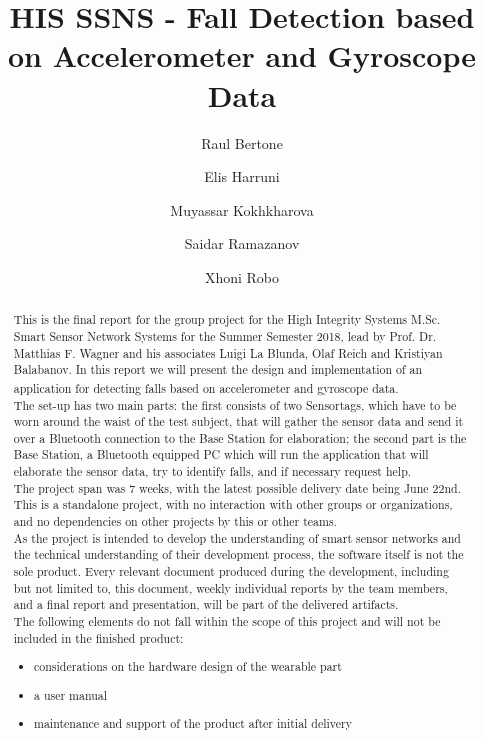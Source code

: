\documentclass[conference,12pt]{IEEETran}
\title{HIS SSNS - Fall Detection based on Accelerometer and Gyroscope Data}
\author{
	 Raul Bertone
\and Elis Harruni
\and Muyassar Kokhkharova
\and Saidar Ramazanov
\and Xhoni Robo
}
\begin{document}
\maketitle

\begin{abstract}

This is the final report for the group project for the High Integrity Systems M.Sc. Smart Sensor Network Systems for the Summer Semester 2018, lead by Prof. Dr. Matthias F. Wagner and his associates Luigi La Blunda, Olaf Reich and Kristiyan Balabanov. In this report we will present the design and implementation of an application for detecting falls based on accelerometer and gyroscope data\textsuperscript{\cite{lablunda}}.\\
The set-up has two main parts: the first consists of two Sensortags, which have to be worn around the waist of the test subject, that will gather the sensor data and send it over a Bluetooth connection to the Base Station for elaboration; the second part is the Base Station, a Bluetooth equipped PC which will run the application that will elaborate the sensor data, try to identify falls, and if necessary request help.\\
The project span was 7 weeks, with the latest possible delivery date being June 22nd.\\
This is a standalone project, with no interaction with other groups or organizations, and no dependencies on other projects by this or other teams.\\
As the project is intended to develop the understanding of smart sensor networks and the technical understanding of their development process, the software itself is not the sole product. Every relevant document produced during the development, including but not limited to, this document, weekly individual reports by the team members, and a final report and presentation, will be part of the delivered artifacts.\\
The following elements do not fall within the scope of this project and will not be included in the finished product:
\begin{itemize}
	\item considerations on the hardware design of the wearable part
	\item a user manual
	\item maintenance and support of the product after initial delivery
\end{itemize}	
\end{abstract}
\end{document}
